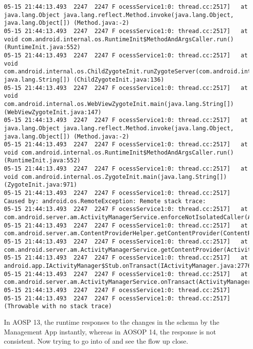 \begin{lstlisting}
05-15 21:44:13.493  2247  2247 F ocessService1:0: thread.cc:2517]   at java.lang.Object java.lang.reflect.Method.invoke(java.lang.Object, java.lang.Object[]) (Method.java:-2)
05-15 21:44:13.493  2247  2247 F ocessService1:0: thread.cc:2517]   at void com.android.internal.os.RuntimeInit$MethodAndArgsCaller.run() (RuntimeInit.java:552)
05-15 21:44:13.493  2247  2247 F ocessService1:0: thread.cc:2517]   at void com.android.internal.os.ChildZygoteInit.runZygoteServer(com.android.internal.os.ZygoteServer, java.lang.String[]) (ChildZygoteInit.java:136)
05-15 21:44:13.493  2247  2247 F ocessService1:0: thread.cc:2517]   at void com.android.internal.os.WebViewZygoteInit.main(java.lang.String[]) (WebViewZygoteInit.java:147)
05-15 21:44:13.493  2247  2247 F ocessService1:0: thread.cc:2517]   at java.lang.Object java.lang.reflect.Method.invoke(java.lang.Object, java.lang.Object[]) (Method.java:-2)
05-15 21:44:13.493  2247  2247 F ocessService1:0: thread.cc:2517]   at void com.android.internal.os.RuntimeInit$MethodAndArgsCaller.run() (RuntimeInit.java:552)
05-15 21:44:13.493  2247  2247 F ocessService1:0: thread.cc:2517]   at void com.android.internal.os.ZygoteInit.main(java.lang.String[]) (ZygoteInit.java:971)
05-15 21:44:13.493  2247  2247 F ocessService1:0: thread.cc:2517] Caused by: android.os.RemoteException: Remote stack trace:
05-15 21:44:13.493  2247  2247 F ocessService1:0: thread.cc:2517] 	at com.android.server.am.ActivityManagerService.enforceNotIsolatedCaller(ActivityManagerService.java:3079)
05-15 21:44:13.493  2247  2247 F ocessService1:0: thread.cc:2517] 	at com.android.server.am.ContentProviderHelper.getContentProvider(ContentProviderHelper.java:130)
05-15 21:44:13.493  2247  2247 F ocessService1:0: thread.cc:2517] 	at com.android.server.am.ActivityManagerService.getContentProvider(ActivityManagerService.java:6782)
05-15 21:44:13.493  2247  2247 F ocessService1:0: thread.cc:2517] 	at android.app.IActivityManager$Stub.onTransact(IActivityManager.java:2776)
05-15 21:44:13.493  2247  2247 F ocessService1:0: thread.cc:2517] 	at com.android.server.am.ActivityManagerService.onTransact(ActivityManagerService.java:2763)
05-15 21:44:13.493  2247  2247 F ocessService1:0: thread.cc:2517] 
05-15 21:44:13.493  2247  2247 F ocessService1:0: thread.cc:2517] (Throwable with no stack trace)
\end{lstlisting}

In AOSP 13, the runtime responses to the changes in the schema by the Management App instantly, whereas in AOSOP 14, the response is not consistent. Now trying to go into  of  and see the flow up close.

